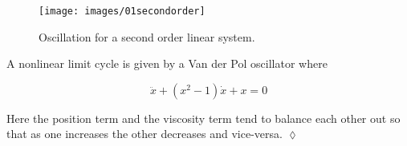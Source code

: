 \begin{figure}[ht!]
\centering
\texttt{[image: images/01secondorder]}
\caption{Oscillation for a second order linear system.}%
\label{fig:01secondorder}
\end{figure}

\begin{example}
A nonlinear limit cycle is given by a Van der Pol oscillator where

\begin{equation*}
\ddot{x} + (x^2-1)\dot{x} + x = 0
\end{equation*}

Here the position term and the viscosity term tend to balance each other out so that as one increases the other decreases and vice-versa.
$\lozenge$
\end{example}

